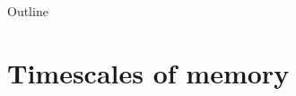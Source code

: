 \documentclass[final]{beamer}%
\begin{document}
\begin{frame}{Outline}
%
 \tableofcontents%
%
%
\end{frame}

%
\section{Timescales of memory}

%
%
%
%
\end{document}
